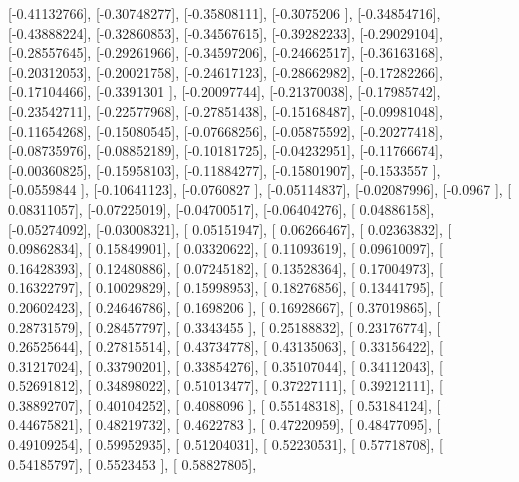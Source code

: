 \documentclass{article}
\begin{document}
       [-0.41132766],
       [-0.30748277],
       [-0.35808111],
       [-0.3075206 ],
       [-0.34854716],
       [-0.43888224],
       [-0.32860853],
       [-0.34567615],
       [-0.39282233],
       [-0.29029104],
       [-0.28557645],
       [-0.29261966],
       [-0.34597206],
       [-0.24662517],
       [-0.36163168],
       [-0.20312053],
       [-0.20021758],
       [-0.24617123],
       [-0.28662982],
       [-0.17282266],
       [-0.17104466],
       [-0.3391301 ],
       [-0.20097744],
       [-0.21370038],
       [-0.17985742],
       [-0.23542711],
       [-0.22577968],
       [-0.27851438],
       [-0.15168487],
       [-0.09981048],
       [-0.11654268],
       [-0.15080545],
       [-0.07668256],
       [-0.05875592],
       [-0.20277418],
       [-0.08735976],
       [-0.08852189],
       [-0.10181725],
       [-0.04232951],
       [-0.11766674],
       [-0.00360825],
       [-0.15958103],
       [-0.11884277],
       [-0.15801907],
       [-0.1533557 ],
       [-0.0559844 ],
       [-0.10641123],
       [-0.0760827 ],
       [-0.05114837],
       [-0.02087996],
       [-0.0967    ],
       [ 0.08311057],
       [-0.07225019],
       [-0.04700517],
       [-0.06404276],
       [ 0.04886158],
       [-0.05274092],
       [-0.03008321],
       [ 0.05151947],
       [ 0.06266467],
       [ 0.02363832],
       [ 0.09862834],
       [ 0.15849901],
       [ 0.03320622],
       [ 0.11093619],
       [ 0.09610097],
       [ 0.16428393],
       [ 0.12480886],
       [ 0.07245182],
       [ 0.13528364],
       [ 0.17004973],
       [ 0.16322797],
       [ 0.10029829],
       [ 0.15998953],
       [ 0.18276856],
       [ 0.13441795],
       [ 0.20602423],
       [ 0.24646786],
       [ 0.1698206 ],
       [ 0.16928667],
       [ 0.37019865],
       [ 0.28731579],
       [ 0.28457797],
       [ 0.3343455 ],
       [ 0.25188832],
       [ 0.23176774],
       [ 0.26525644],
       [ 0.27815514],
       [ 0.43734778],
       [ 0.43135063],
       [ 0.33156422],
       [ 0.31217024],
       [ 0.33790201],
       [ 0.33854276],
       [ 0.35107044],
       [ 0.34112043],
       [ 0.52691812],
       [ 0.34898022],
       [ 0.51013477],
       [ 0.37227111],
       [ 0.39212111],
       [ 0.38892707],
       [ 0.40104252],
       [ 0.4088096 ],
       [ 0.55148318],
       [ 0.53184124],
       [ 0.44675821],
       [ 0.48219732],
       [ 0.4622783 ],
       [ 0.47220959],
       [ 0.48477095],
       [ 0.49109254],
       [ 0.59952935],
       [ 0.51204031],
       [ 0.52230531],
       [ 0.57718708],
       [ 0.54185797],
       [ 0.5523453 ],
       [ 0.58827805],
\end{document}
